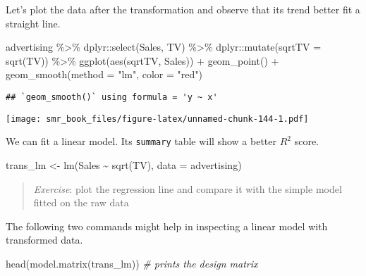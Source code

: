 \documentclass[
  oneside]{book}
\newenvironment{Shaded}{\begin{snugshade}}{\end{snugshade}}
\newcommand{\AttributeTok}[1]{\textcolor[rgb]{0.77,0.63,0.00}{#1}}
\newcommand{\CommentTok}[1]{\textcolor[rgb]{0.56,0.35,0.01}{\textit{#1}}}
\newcommand{\FunctionTok}[1]{\textcolor[rgb]{0.00,0.00,0.00}{#1}}
\newcommand{\NormalTok}[1]{#1}
\newcommand{\OtherTok}[1]{\textcolor[rgb]{0.56,0.35,0.01}{#1}}
\newcommand{\SpecialCharTok}[1]{\textcolor[rgb]{0.00,0.00,0.00}{#1}}
\newcommand{\StringTok}[1]{\textcolor[rgb]{0.31,0.60,0.02}{#1}}
\begin{document}
Let's plot the data after the transformation and observe
that its trend better fit a straight line.

\begin{Shaded}
\begin{Highlighting}[]
\NormalTok{advertising }\SpecialCharTok{\%\textgreater{}\%}
\NormalTok{  dplyr}\SpecialCharTok{::}\FunctionTok{select}\NormalTok{(Sales, TV) }\SpecialCharTok{\%\textgreater{}\%}
\NormalTok{  dplyr}\SpecialCharTok{::}\FunctionTok{mutate}\NormalTok{(}\AttributeTok{sqrtTV =} \FunctionTok{sqrt}\NormalTok{(TV)) }\SpecialCharTok{\%\textgreater{}\%}
  \FunctionTok{ggplot}\NormalTok{(}\FunctionTok{aes}\NormalTok{(sqrtTV, Sales)) }\SpecialCharTok{+}
  \FunctionTok{geom\_point}\NormalTok{() }\SpecialCharTok{+}
  \FunctionTok{geom\_smooth}\NormalTok{(}\AttributeTok{method =} \StringTok{"lm"}\NormalTok{, }\AttributeTok{color =} \StringTok{"red"}\NormalTok{)}
\end{Highlighting}
\end{Shaded}

\begin{verbatim}
## `geom_smooth()` using formula = 'y ~ x'
\end{verbatim}

\texttt{[image: smr\_book\_files/figure-latex/unnamed-chunk-144-1.pdf]}

We can fit a linear model. Its \texttt{summary} table
will show a better \(R^2\) score.

\begin{Shaded}
\begin{Highlighting}[]
\NormalTok{trans\_lm }\OtherTok{\textless{}{-}} \FunctionTok{lm}\NormalTok{(Sales }\SpecialCharTok{\textasciitilde{}} \FunctionTok{sqrt}\NormalTok{(TV), }\AttributeTok{data =}\NormalTok{ advertising)}
\end{Highlighting}
\end{Shaded}

\begin{quote}
\emph{Exercise}: plot the regression line and compare it with
the simple model fitted on the raw data
\end{quote}

The following two commands might help in inspecting
a linear model with transformed data.

\begin{Shaded}
\begin{Highlighting}[]
\FunctionTok{head}\NormalTok{(}\FunctionTok{model.matrix}\NormalTok{(trans\_lm)) }\CommentTok{\# prints the design matrix}
\end{Highlighting}
\end{Shaded}
\end{document}
